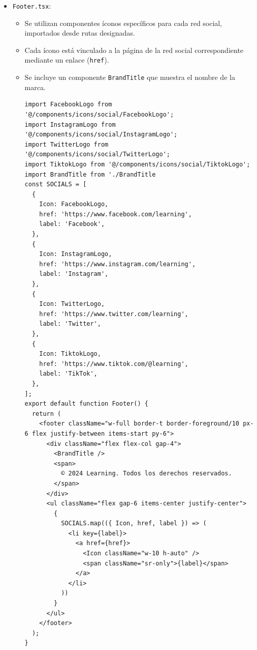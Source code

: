 \begin{itemize}
  \item \texttt{Footer.tsx}:
  \begin{itemize}
    \item Se utilizan componentes íconos específicos para cada red social, importados desde rutas designadas.
    \item Cada ícono está vinculado a la página de la red social correspondiente mediante un enlace (\texttt{href}).
    \item Se incluye un componente \texttt{BrandTitle} que muestra el nombre de la marca.
    \begin{verbatim}
import FacebookLogo from '@/components/icons/social/FacebookLogo';
import InstagramLogo from '@/components/icons/social/InstagramLogo';
import TwitterLogo from '@/components/icons/social/TwitterLogo';
import TiktokLogo from '@/components/icons/social/TiktokLogo';
import BrandTitle from './BrandTitle
const SOCIALS = [
  {
    Icon: FacebookLogo,
    href: 'https://www.facebook.com/learning',
    label: 'Facebook',
  },
  {
    Icon: InstagramLogo,
    href: 'https://www.instagram.com/learning',
    label: 'Instagram',
  },
  {
    Icon: TwitterLogo,
    href: 'https://www.twitter.com/learning',
    label: 'Twitter',
  },
  {
    Icon: TiktokLogo,
    href: 'https://www.tiktok.com/@learning',
    label: 'TikTok',
  },
];
export default function Footer() {
  return (
    <footer className="w-full border-t border-foreground/10 px-6 flex justify-between items-start py-6">
      <div className="flex flex-col gap-4">
        <BrandTitle />
        <span>
          © 2024 Learning. Todos los derechos reservados.
        </span>
      </div>
      <ul className="flex gap-6 items-center justify-center">
        {
          SOCIALS.map(({ Icon, href, label }) => (
            <li key={label}>
              <a href={href}>
                <Icon className="w-10 h-auto" />
                <span className="sr-only">{label}</span>
              </a>
            </li>
          ))
        }
      </ul>
    </footer>
  );
}
    \end{verbatim}
  \end{itemize}
  

\end{itemize}
